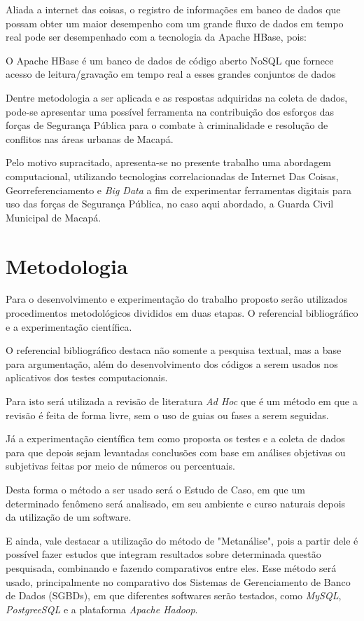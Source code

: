 Aliada a internet das coisas, o registro de informações em banco de dados que possam obter um maior desempenho com um grande fluxo de dados em tempo real pode ser desempenhado com a tecnologia da Apache HBase, pois:

O Apache HBase é um banco de dados de código aberto NoSQL que fornece acesso de leitura/gravação em tempo real a esses grandes conjuntos de dados\cite{CETAX}

Dentre metodologia a ser aplicada e as respostas adquiridas na coleta de dados, pode-se apresentar uma possível ferramenta na contribuição dos esforços das forças de Segurança Pública para o combate à criminalidade e resolução de conflitos nas áreas urbanas de Macapá.
 
Pelo motivo supracitado, apresenta-se no presente trabalho uma abordagem computacional, utilizando tecnologias correlacionadas de Internet Das Coisas, Georreferenciamento e \textit{Big Data} a fim de experimentar ferramentas digitais para uso das forças de Segurança Pública, no caso aqui abordado, a Guarda Civil Municipal de Macapá.

\section {Metodologia}
Para o desenvolvimento e experimentação do trabalho proposto serão utilizados procedimentos metodológicos divididos em duas etapas. O referencial bibliográfico e a experimentação científica.

O referencial bibliográfico destaca não somente a pesquisa textual, mas a base para argumentação, além do desenvolvimento dos códigos a serem usados nos aplicativos dos testes computacionais.

Para isto será utilizada a revisão de literatura \textit{Ad Hoc} que é um método em que a revisão é feita de forma livre, sem o uso de guias ou fases a serem seguidas\cite{Jacobsen-metodologia}.

Já a experimentação científica tem como proposta os testes e a coleta de dados para que depois sejam levantadas conclusões com base em análises objetivas ou subjetivas feitas por meio de números ou percentuais.

Desta forma o método a ser usado será o Estudo de Caso, em que um determinado fenômeno será analisado, em seu ambiente e curso naturais depois da utilização de um software\cite{Jacobsen-metodologia}.

E ainda, vale destacar a utilização do método de "Metanálise", pois a partir dele é possível fazer estudos que integram resultados sobre determinada questão pesquisada, combinando e fazendo comparativos entre eles\cite{Jacobsen-metodologia}. Esse método será usado, principalmente no comparativo dos Sistemas de Gerenciamento de Banco de Dados (SGBDs), em que diferentes softwares serão testados, como \textit{MySQL}, \textit{PostgreeSQL} e a plataforma \textit{Apache Hadoop}. 

